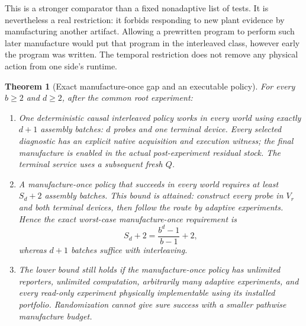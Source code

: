 \documentclass[11pt]{article}
\newtheorem{theorem}{Theorem}[section]
\theoremstyle{definition}
\theoremstyle{remark}
\begin{document}
This is a stronger comparator than a fixed nonadaptive list of tests. It
is nevertheless a real restriction: it forbids responding to new plant
evidence by manufacturing another artifact. Allowing a prewritten
program to perform such later manufacture would put that program in the
interleaved class, however early the program was written. The temporal
restriction does not remove any physical action from one side's runtime.

\begin{theorem}[Exact manufacture-once gap and an executable policy]
\label{ing:gap}
For every $b\geq2$ and $d\geq2$, after the common root experiment:
\begin{enumerate}
\item One deterministic causal interleaved policy works in every world
using exactly $d+1$ assembly batches: $d$ probes and one terminal device.
Every selected diagnostic has an explicit native acquisition and execution
witness; the final manufacture is enabled in the actual post-experiment
residual stock. The terminal service uses a subsequent fresh $Q$.
\item A manufacture-once policy that succeeds in every world requires at
least $S_d+2$ assembly batches. This bound is attained: construct every
probe in $V_r$ and both terminal devices, then follow the route by adaptive
experiments. Hence the exact worst-case manufacture-once requirement is
\[
 S_d+2=\frac{b^d-1}{b-1}+2,
\]
whereas $d+1$ batches suffice with interleaving.
\item The lower bound still holds if the manufacture-once policy has
unlimited reporters, unlimited computation, arbitrarily many adaptive
experiments, and every read-only experiment physically implementable
using its installed portfolio. Randomization cannot give sure success
with a smaller pathwise manufacture budget.
\end{enumerate}
\end{theorem}
\end{document}
